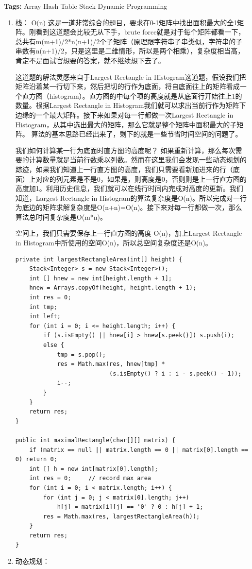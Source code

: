 \documentclass[12pt]{book}
\begin{document}
\textbf{Tags:} Array Hash Table Stack Dynamic Programming
\begin{enumerate}
\item 栈： O(n)
\label{sec-5-3-4-1}
这是一道非常综合的题目，要求在0-1矩阵中找出面积最大的全1矩阵。刚看到这道题会比较无从下手，brute force就是对于每个矩阵都看一下，总共有m(m+1)/2*n(n+1)/2个子矩阵（原理跟字符串子串类似，字符串的子串数有n(n+1)/2，只是这里是二维情形，所以是两个相乘），复杂度相当高，肯定不是面试官想要的答案，就不继续想下去了。

这道题的解法灵感来自于Largest Rectangle in Histogram这道题，假设我们把矩阵沿着某一行切下来，然后把切的行作为底面，将自底面往上的矩阵看成一个直方图（histogram）。直方图的中每个项的高度就是从底面行开始往上1的数量。根据Largest Rectangle in Histogram我们就可以求出当前行作为矩阵下边缘的一个最大矩阵。接下来如果对每一行都做一次Largest Rectangle in Histogram，从其中选出最大的矩阵，那么它就是整个矩阵中面积最大的子矩阵。
算法的基本思路已经出来了，剩下的就是一些节省时间空间的问题了。

我们如何计算某一行为底面时直方图的高度呢？ 如果重新计算，那么每次需要的计算数量就是当前行数乘以列数。然而在这里我们会发现一些动态规划的踪迹，如果我们知道上一行直方图的高度，我们只需要看新加进来的行（底面）上对应的列元素是不是0，如果是，则高度是0，否则则是上一行直方图的高度加1。利用历史信息，我们就可以在线行时间内完成对高度的更新。我们知道，Largest Rectangle in Histogram的算法复杂度是O(n)。所以完成对一行为底边的矩阵求解复杂度是O(n+n)=O(n)。接下来对每一行都做一次，那么算法总时间复杂度是O(m*n)。

空间上，我们只需要保存上一行直方图的高度 O(n)，加上Largest Rectangle in Histogram中所使用的空间O(n)，所以总空间复杂度还是O(n)。

\lstset{language=java,label= ,caption= ,numbers=none}
\begin{lstlisting}
private int largestRectangleArea(int[] height) {
    Stack<Integer> s = new Stack<Integer>();
    int [] hnew = new int[height.length + 1];
    hnew = Arrays.copyOf(height, height.length + 1);
    int res = 0; 
    int tmp;     
    int left;
    for (int i = 0; i <= height.length; i++) {
        if (s.isEmpty() || hnew[i] > hnew[s.peek()]) s.push(i);
        else {
            tmp = s.pop();
            res = Math.max(res, hnew[tmp] * 
                           (s.isEmpty() ? i : i - s.peek() - 1));
            i--;
        }
    }
    return res;
}

public int maximalRectangle(char[][] matrix) {
    if (matrix == null || matrix.length == 0 || matrix[0].length == 0) return 0;
    int [] h = new int[matrix[0].length];
    int res = 0;     // record max area
    for (int i = 0; i < matrix.length; i++) {
        for (int j = 0; j < matrix[0].length; j++) 
            h[j] = matrix[i][j] == '0' ? 0 : h[j] + 1;
        res = Math.max(res, largestRectangleArea(h));
    }
    return res;
}
\end{lstlisting}
\item 动态规划：
\label{sec-5-3-4-2}


\end{enumerate}
\end{document}
